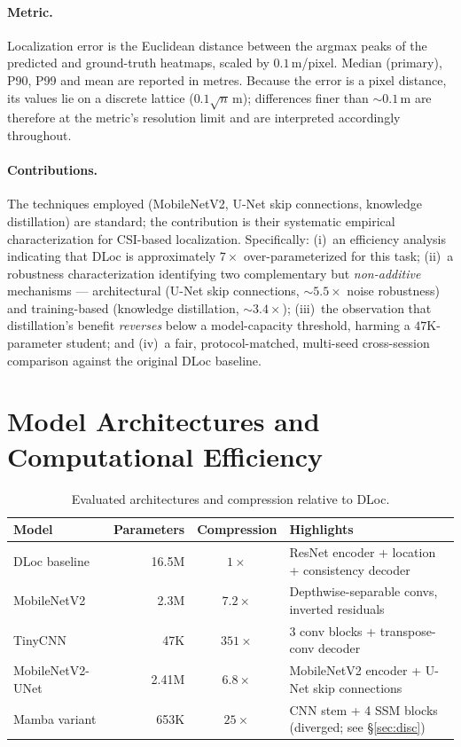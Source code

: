 \documentclass[11pt,a4paper]{article}
\begin{document}
\paragraph{Metric.} Localization error is the Euclidean distance between the argmax peaks of the
predicted and ground-truth heatmaps, scaled by $0.1$\,m/pixel. Median (primary), P90, P99 and
mean are reported in metres. Because the error is a pixel distance, its values lie on a discrete
lattice ($0.1\sqrt{n}$\,m); differences finer than ${\sim}0.1$\,m are therefore at the metric's
resolution limit and are interpreted accordingly throughout.

\paragraph{Contributions.} The techniques employed (MobileNetV2, U-Net skip connections,
knowledge distillation) are standard; the contribution is their systematic empirical
characterization for CSI-based localization. Specifically: (i)~an efficiency analysis indicating
that DLoc is approximately $7\times$ over-parameterized for this task; (ii)~a robustness
characterization identifying two complementary but \emph{non-additive} mechanisms --- architectural
(U-Net skip connections, ${\sim}5.5\times$ noise robustness) and training-based (knowledge
distillation, ${\sim}3.4\times$); (iii)~the observation that distillation's benefit \emph{reverses}
below a model-capacity threshold, harming a $47$K-parameter student; and (iv)~a fair,
protocol-matched, multi-seed cross-session comparison against the original DLoc baseline.

\section{Model Architectures and Computational Efficiency}

\begin{table}[H]
\centering
\caption{Evaluated architectures and compression relative to DLoc.}
\label{tab:arch}
\begin{tabular}{@{}lrcl@{}}
\toprule
\textbf{Model} & \textbf{Parameters} & \textbf{Compression} & \textbf{Highlights} \\
\midrule
DLoc baseline    & 16.5M & $1\times$    & ResNet encoder + location + consistency decoder \\
MobileNetV2      & 2.3M  & $7.2\times$  & Depthwise-separable convs, inverted residuals \\
TinyCNN          & 47K   & $351\times$  & 3 conv blocks + transpose-conv decoder \\
MobileNetV2-UNet & 2.41M & $6.8\times$  & MobileNetV2 encoder + U-Net skip connections \\
Mamba variant    & 653K  & $25\times$   & CNN stem + 4 SSM blocks (diverged; see \S\ref{sec:disc}) \\
\bottomrule
\end{tabular}
\end{table}
\end{document}
